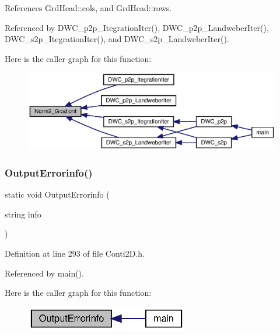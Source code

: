 References Grd\+Head\+::cols, and Grd\+Head\+::rows.



Referenced by D\+W\+C\+\_\+p2p\+\_\+\+Itegration\+Iter(), D\+W\+C\+\_\+p2p\+\_\+\+Landweber\+Iter(), D\+W\+C\+\_\+s2p\+\_\+\+Itegration\+Iter(), and D\+W\+C\+\_\+s2p\+\_\+\+Landweber\+Iter().

Here is the caller graph for this function\+:\nopagebreak
\begin{figure}[H]
\begin{center}
\leavevmode
\includegraphics[width=350pt]{Conti2D_8h_a43fc3af75243a047d61aadea31c0fa9c_a43fc3af75243a047d61aadea31c0fa9c_icgraph}
\end{center}
\end{figure}
\mbox{\label{Conti2D_8h_a7e3ffae645d4a98ee8a39830e6dd2f46_a7e3ffae645d4a98ee8a39830e6dd2f46}} 
\subsubsection{Output\+Errorinfo()}
{\footnotesize\ttfamily static void Output\+Errorinfo (\begin{DoxyParamCaption}\item[{string}]{info }\end{DoxyParamCaption})\hspace{0.3cm}{\ttfamily [static]}}



Definition at line 293 of file Conti2\+D.\+h.



Referenced by main().

Here is the caller graph for this function\+:\nopagebreak
\begin{figure}[H]
\begin{center}
\leavevmode
\includegraphics[width=202pt]{Conti2D_8h_a7e3ffae645d4a98ee8a39830e6dd2f46_a7e3ffae645d4a98ee8a39830e6dd2f46_icgraph}
\end{center}
\end{figure}
\mbox{\label{Conti2D_8h_af6e0e75c33384cc17e08626d17dc381d_af6e0e75c33384cc17e08626d17dc381d}} 
